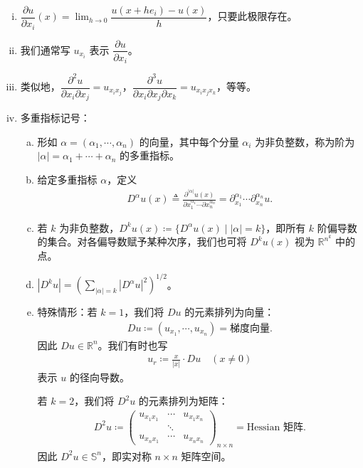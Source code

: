 \documentclass[../main.tex]{subfiles}
\begin{document}
\begin{enumerate}[(i)]
\item $\dfrac{\partial u}{\partial x_i}(x)=\lim_{h\to 0}\dfrac{u(x+he_i)-u(x)}{h}$，只要此极限存在。

\item 我们通常写 $u_{x_i}$ 表示 $\dfrac{\partial u}{\partial x_i}$。

\item 类似地，$\dfrac{\partial^2u}{\partial x_i\partial x_j}=u_{x_ix_j}$，$\dfrac{\partial^3u}{\partial x_i\partial x_j\partial x_k}=u_{x_ix_jx_k}$，等等。

\item 多重指标记号：
\begin{enumerate}[(a)]
\item 形如 $\alpha=(\alpha_1,\cdots,\alpha_n)$ 的向量，其中每个分量 $\alpha_i$ 为非负整数，称为阶为 $|\alpha|=\alpha_1+\cdots+\alpha_n$ 的多重指标。

\item 给定多重指标 $\alpha$，定义
\begin{align*}
D^\alpha u(x)\triangleq\frac{\partial^{|\alpha|}u(x)}{\partial x_1^{\alpha_1}\cdots\partial x_n^{\alpha_n}}=\partial_{x_1}^{\alpha_1}\cdots\partial_{x_n}^{\alpha_n}u.
\end{align*}

\item 若 $k$ 为非负整数，$D^ku(x)\coloneqq\{D^\alpha u(x)\mid|\alpha|=k\}$，即所有 $k$ 阶偏导数的集合。对各偏导数赋予某种次序，我们也可将 $D^ku(x)$ 视为 $\mathbb{R}^{n^k}$ 中的点。

\item $|D^ku|=\left(\sum_{|\alpha|=k}|D^\alpha u|^2\right)^{1/2}$。

\item 特殊情形：若 $k=1$，我们将 $Du$ 的元素排列为向量：
\begin{align*}
Du\coloneqq(u_{x_1},\cdots,u_{x_n})=\text{梯度向量}.
\end{align*}
因此 $Du\in\mathbb{R}^n$。我们有时也写
\begin{align*}
u_r\coloneqq\frac{x}{|x|}\cdot Du \quad (x\neq 0)
\end{align*}
表示 $u$ 的径向导数。

若 $k=2$，我们将 $D^2u$ 的元素排列为矩阵：
\begin{align*}
D^2u\coloneqq
\begin{pmatrix}
u_{x_1x_1} & \cdots & u_{x_1x_n}\\
& \ddots & \\
u_{x_nx_1} & \cdots & u_{x_nx_n}
\end{pmatrix}_{n\times n}
=\text{Hessian 矩阵}.
\end{align*}
因此 $D^2u\in\mathbb{S}^n$，即实对称 $n\times n$ 矩阵空间。
\end{enumerate}


\end{enumerate}
\end{document}
